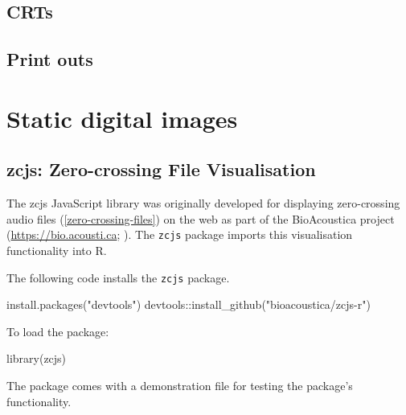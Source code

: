 \documentclass[
]{book}
\newenvironment{Shaded}{\begin{snugshade}}{\end{snugshade}}
\newcommand{\FunctionTok}[1]{\textcolor[rgb]{0.00,0.00,0.00}{#1}}
\newcommand{\NormalTok}[1]{#1}
\newcommand{\SpecialCharTok}[1]{\textcolor[rgb]{0.00,0.00,0.00}{#1}}
\newcommand{\StringTok}[1]{\textcolor[rgb]{0.31,0.60,0.02}{#1}}
\begin{document}
\hypertarget{crts}{%
\section{CRTs}\label{crts}}

\hypertarget{print-outs}{%
\section{Print outs}\label{print-outs}}

\hypertarget{static-digital-images}{%
\chapter{Static digital images}\label{static-digital-images}}

\hypertarget{zcjs-zero-crossing-file-visualisation}{%
\section{zcjs: Zero-crossing File Visualisation}\label{zcjs-zero-crossing-file-visualisation}}

The zcjs JavaScript library was originally developed for displaying zero-crossing audio files (\ref{zero-crossing-files}) on the web as part of the BioAcoustica project (\url{https://bio.acousti.ca}; \citet{baker2015bioacoustica}). The \texttt{zcjs} package \citep{zcjsr} imports this visualisation functionality into R.

The following code installs the \texttt{zcjs} package.

\begin{Shaded}
\begin{Highlighting}[]
\FunctionTok{install.packages}\NormalTok{(}\StringTok{"devtools"}\NormalTok{)}
\NormalTok{devtools}\SpecialCharTok{::}\FunctionTok{install\_github}\NormalTok{(}\StringTok{"bioacoustica/zcjs{-}r"}\NormalTok{)}
\end{Highlighting}
\end{Shaded}

To load the package:

\begin{Shaded}
\begin{Highlighting}[]
\FunctionTok{library}\NormalTok{(zcjs)}
\end{Highlighting}
\end{Shaded}

The package comes with a demonstration file for testing the package's functionality.
\end{document}
